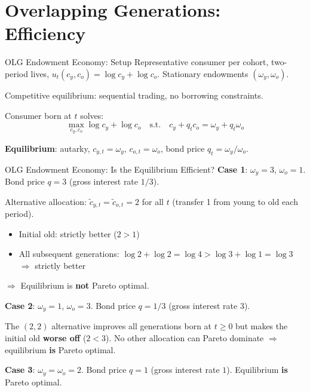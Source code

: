\documentclass[blue]{beamer}
\begin{document}
\section{Overlapping Generations: Efficiency}

\begin{frame}{OLG Endowment Economy: Setup}
	Representative consumer per cohort, two-period lives, $u_t(c_y, c_o) = \log c_y + \log c_o$. Stationary endowments $(\omega_y, \omega_o)$.
	
	\bigskip
	Competitive equilibrium: sequential trading, no borrowing constraints.
	
	\bigskip
	Consumer born at $t$ solves:
	\[
	\max_{c_y, c_o} \log c_y + \log c_o \quad \text{s.t.} \quad c_y + q_t c_o = \omega_y + q_t \omega_o
	\]
	
	\textbf{Equilibrium}: autarky, $c_{y,t} = \omega_y$, $c_{o,t} = \omega_o$, bond price $q_t = \omega_y/\omega_o$.
\end{frame}

\begin{frame}{OLG Endowment Economy: Is the Equilibrium Efficient?}
	\textbf{Case 1}: $\omega_y = 3$, $\omega_o = 1$. Bond price $q = 3$ (gross interest rate $1/3$).
	
	Alternative allocation: $\tilde{c}_{y,t} = \tilde{c}_{o,t} = 2$ for all $t$ (transfer 1 from young to old each period).
	\begin{itemize}
		\item Initial old: strictly better ($2 > 1$)
		\item All subsequent generations: $\log 2 + \log 2 = \log 4 > \log 3 + \log 1 = \log 3$ $\Rightarrow$ strictly better
	\end{itemize}
	$\Rightarrow$ Equilibrium is \textbf{not} Pareto optimal.
	

	\textbf{Case 2}: $\omega_y = 1$, $\omega_o = 3$. Bond price $q = 1/3$ (gross interest rate $3$).
	
	The $(2, 2)$ alternative improves all generations born at $t \geq 0$ but makes the initial old \textbf{worse off} ($2 < 3$). No other allocation can Pareto dominate $\Rightarrow$ equilibrium \textbf{is} Pareto optimal.
	
	\bigskip
	\textbf{Case 3}: $\omega_y = \omega_o = 2$. Bond price $q = 1$ (gross interest rate $1$). Equilibrium \textbf{is} Pareto optimal.
\end{frame}
\end{document}

